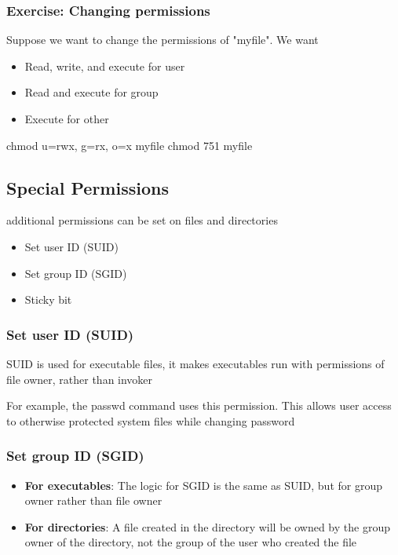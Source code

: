 \documentclass{report}
\begin{document}
    \subsubsection{Exercise: Changing permissions}
    \bigbreak \noindent 
    Suppose we want to change the permissions of "myfile". We want
    \begin{itemize}
        \item Read, write, and execute for user 
        \item Read and execute for group
        \item Execute for other
    \end{itemize}
    \bigbreak \noindent 
    \begin{bashcode}
    chmod u=rwx, g=rx, o=x myfile
    chmod 751 myfile
    \end{bashcode}

    \bigbreak \noindent 
    \subsection{Special Permissions}
    \bigbreak {} additional permissions can be set on files and directories
    \begin{itemize}
        \item Set user ID (SUID)
        \item Set group ID (SGID)
        \item Sticky bit
    \end{itemize}

    \bigbreak \noindent 
    \subsubsection{Set user ID (SUID)}
    \bigbreak \noindent 
    \begin{concept}
       SUID is used for executable files, it makes executables run with permissions of file owner, rather than invoker 
    \end{concept}
    \bigbreak \noindent 
    For example, the passwd command uses this permission. This allows user access to otherwise protected system files while changing password

    \pagebreak 
    \subsubsection{Set group ID (SGID)}
    \bigbreak \noindent 
    \begin{concept}
        \begin{itemize}
            \item \textbf{For executables}: The logic for SGID is the same as SUID, but for group owner rather than file owner
            \item \textbf{For directories}: A file created in the directory will be owned by the group owner of the directory, not the group of the user who created the file
        \end{itemize}
    \end{concept}
\end{document}
